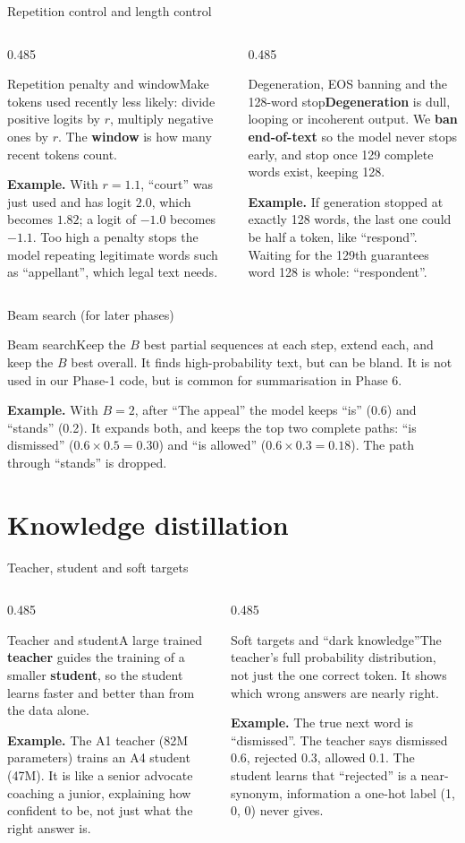 \documentclass[aspectratio=169,11pt]{beamer}
\newcommand{\term}[3]{%
  \begin{block}{#1}\small #2\par\vspace{1mm}%
  {\color{exgreen}\textbf{Example.}} #3\end{block}}
\newcommand{\twoterms}[6]{%
  \begin{columns}[T]
    \begin{column}{0.485\textwidth}\term{#1}{#2}{#3}\end{column}
    \begin{column}{0.485\textwidth}\term{#4}{#5}{#6}\end{column}
  \end{columns}}
\begin{document}
\begin{frame}{Repetition control and length control}
  \twoterms{Repetition penalty and window}
  {Make tokens used recently less likely: divide positive logits by $r$, multiply negative ones by $r$. The \textbf{window} is how many recent tokens count.}
  {With $r=1.1$, ``court'' was just used and has logit $2.0$, which becomes $1.82$; a logit of $-1.0$ becomes $-1.1$. Too high a penalty stops the model repeating legitimate words such as ``appellant'', which legal text needs.}
  {Degeneration, EOS banning and the 128-word stop}
  {\textbf{Degeneration} is dull, looping or incoherent output. We \textbf{ban end-of-text} so the model never stops early, and stop once 129 complete words exist, keeping 128.}
  {If generation stopped at exactly 128 words, the last one could be half a token, like ``respond''. Waiting for the 129th guarantees word 128 is whole: ``respondent''.}
\end{frame}

\begin{frame}{Beam search (for later phases)}
  \term{Beam search}
  {Keep the $B$ best partial sequences at each step, extend each, and keep the $B$ best overall. It finds high-probability text, but can be bland. It is not used in our Phase-1 code, but is common for summarisation in Phase 6.}
  {With $B=2$, after ``The appeal'' the model keeps ``is'' (0.6) and ``stands'' (0.2). It expands both, and keeps the top two complete paths: ``is dismissed'' ($0.6\times0.5=0.30$) and ``is allowed'' ($0.6\times0.3=0.18$). The path through ``stands'' is dropped.}
\end{frame}

\section{Knowledge distillation}

\begin{frame}{Teacher, student and soft targets}
  \twoterms{Teacher and student}
  {A large trained \textbf{teacher} guides the training of a smaller \textbf{student}, so the student learns faster and better than from the data alone.}
  {The A1 teacher (82M parameters) trains an A4 student (47M). It is like a senior advocate coaching a junior, explaining how confident to be, not just what the right answer is.}
  {Soft targets and ``dark knowledge''}
  {The teacher's full probability distribution, not just the one correct token. It shows which wrong answers are nearly right.}
  {The true next word is ``dismissed''. The teacher says dismissed 0.6, rejected 0.3, allowed 0.1. The student learns that ``rejected'' is a near-synonym, information a one-hot label (1, 0, 0) never gives.}
\end{frame}
\end{document}
